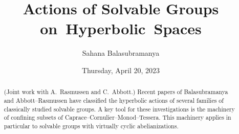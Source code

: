 \documentclass{UAmathtalk}
\author{Sahana Balasubramanya}
\title{Actions of Solvable Groups on~Hyperbolic~Spaces}
\date{Thursday, April 20, 2023}
\begin{document}
\maketitle

\begin{abstract}
(Joint work with A.~Rasmussen and C.~Abbott.) Recent papers of Balasubramanya and Abbott--Rasmussen have classified the hyperbolic actions of several families of classically studied solvable groups. A key tool for these investigations is the machinery of confining subsets of Caprace--Cornulier--Monod--Tessera. This machinery applies in particular to solvable groups with virtually cyclic abelianizations.
\end{abstract}
\end{document}
